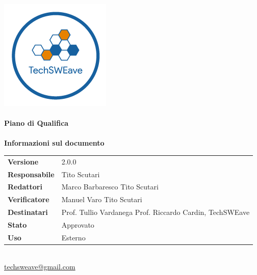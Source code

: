\documentclass[a4paper]{article}
\begin{document}
\begin{titlepage}
    \begin{center}
        \includegraphics{../../../Images/logo}\\
        \vspace{20px}
        \textcolor{logo}{\hrulefill}\\
        \vspace{20px}
        \textbf{\huge\textcolor{logo}{Piano di Qualifica}}\\
        \vspace{10px}
        \textcolor{logo}{\hrulefill}\\
        \vspace{40px}
        \textbf{\Large Informazioni sul documento}\\
        \vspace{20px}
        \begin{tabular}{p{100px} | p{100px}}
            \textbf{Versione}     & 2.0.0                                                                      \\
            \textbf{Responsabile} & Tito Scutari                                                               \\
            \textbf{Redattori}    & Marco Barbaresco \newline Tito Scutari                                     \\
            \textbf{Verificatore} & Manuel Varo \newline Tito Scutari                                          \\
            \textbf{Destinatari}  & Prof. Tullio Vardanega \newline Prof. Riccardo Cardin, \newline TechSWEave \\
            \textbf{Stato}        & Approvato                                                                  \\
            \textbf{Uso}          & Esterno                                                                    \\
        \end{tabular}\\
        \vspace{60px}
        \href{mailto:techsweave@gmail.com}{techsweave@gmail.com}\\

    \end{center}
\end{titlepage}
\end{document}

